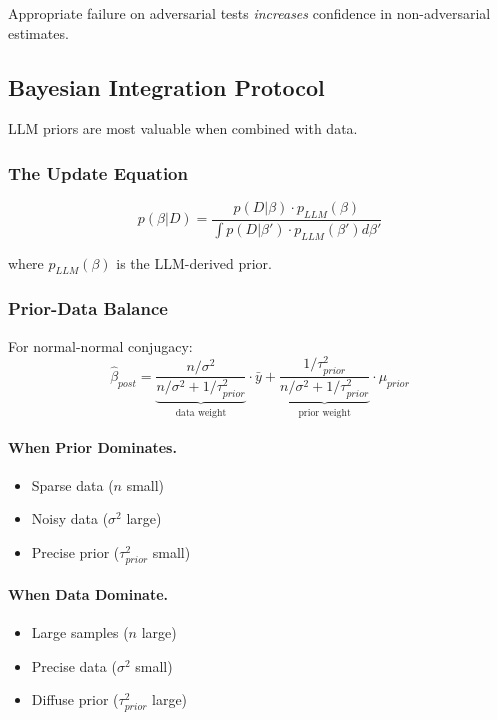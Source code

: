 Appropriate failure on adversarial tests \textit{increases} confidence in non-adversarial estimates.

\subsection{Bayesian Integration Protocol}

LLM priors are most valuable when combined with data.

\subsubsection{The Update Equation}

\begin{equation}
p(\beta | D) = \frac{p(D | \beta) \cdot p_{LLM}(\beta)}{\int p(D | \beta') \cdot p_{LLM}(\beta') d\beta'}
\end{equation}

where $p_{LLM}(\beta)$ is the LLM-derived prior.

\subsubsection{Prior-Data Balance}

For normal-normal conjugacy:
\begin{equation}
\hat{\beta}_{post} = \underbrace{\frac{n/\sigma^2}{n/\sigma^2 + 1/\tau^2_{prior}}}_{\text{data weight}} \cdot \bar{y} + \underbrace{\frac{1/\tau^2_{prior}}{n/\sigma^2 + 1/\tau^2_{prior}}}_{\text{prior weight}} \cdot \mu_{prior}
\end{equation}

\paragraph{When Prior Dominates.}
\begin{itemize}
    \item Sparse data ($n$ small)
    \item Noisy data ($\sigma^2$ large)
    \item Precise prior ($\tau^2_{prior}$ small)
\end{itemize}

\paragraph{When Data Dominate.}
\begin{itemize}
    \item Large samples ($n$ large)
    \item Precise data ($\sigma^2$ small)
    \item Diffuse prior ($\tau^2_{prior}$ large)
\end{itemize}

